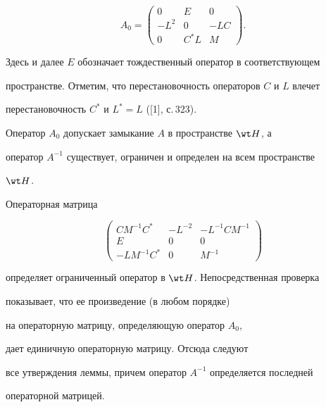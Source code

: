 $$ 


A_0= 


\begin{pmatrix} 


0 & E & 0 \\ -L^2 & 0 & -LC \\ 0 & C^*L & M 


\end{pmatrix} 


. 


$$ 


Здесь и далее $E$ обозначает тождественный оператор в соответствующем 


пространстве. Отметим, что перестановочность операторов $C$ и $L$ влечет 


перестановочность $C^*$ и $L^*=L$ ([1], с.\,323). 


 


 


\begin{lem} 


Оператор $A_0$ допускает замыкание $A$ в пространстве $\wt H$, а 


оператор $A^{-1}$ существует, ограничен и определен на всем пространстве 


$\wt H$. 


\end{lem} 


 


 


\begin{pf} 


Операторная матрица 


$$ 


\begin{pmatrix} 


CM^{-1}C^* & -L^{-2} & -L^{-1}CM^{-1}\\ 


E & 0 & 0 \\ 


-LM^{-1}C^* & 0 & M^{-1} 


\end{pmatrix} 


$$ 


определяет ограниченный оператор в $\wt H$. Непосредственная проверка 


показывает, что ее произведение (в любом порядке) 


на операторную матрицу, определяющую оператор $A_0$, 


дает единичную операторную матрицу. Отсюда следуют 


все утверждения леммы, причем оператор $A^{-1}$ определяется последней 


операторной матрицей. 


\end{pf} 


